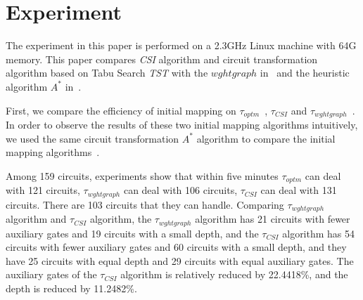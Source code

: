 \documentclass[runningheads]{llncs}
\begin{document}
\section{Experiment}
\label{Experiment}
The experiment in this paper is performed on a 2.3GHz Linux machine with 64G memory. This paper compares  \textit{CSI}  algorithm 
and circuit transformation algorithm based on Tabu Search \textit{TST} with the $wghtgraph$ in~\cite{2020Qubit} and the heuristic algorithm $ A^{*}$  in~\cite{Zulehner2017}.
 
First, we compare the efficiency of initial mapping on $\tau_{optm}$~\cite{Zulehner2017},  $\tau_{CSI}$ and $\tau_{wghtgraph}$~\cite{2020Qubit}. In order to observe the results of these two initial mapping algorithms intuitively, we used the same circuit transformation $ A^{*}$ algorithm to compare the initial mapping algorithms~\cite{Zulehner2017}.

Among 159 circuits, experiments show that within five minutes $\tau_{optm}$ can deal with 121 circuits, $\tau_{wghtgraph}$  can deal with 106 circuits, $\tau_{CSI}$  can deal with  131 circuits. There are 103 circuits that they can handle. Comparing $\tau_{wghtgraph}$ algorithm and $\tau_{CSI}$ algorithm, the $\tau_{wghtgraph}$ algorithm has 21 circuits with fewer auxiliary gates  and 19 circuits with a small depth, and the $\tau_{CSI}$ algorithm has 54 circuits with fewer auxiliary gates and 60 circuits with a small depth, and they have 25 circuits with equal depth and  29 circuits with equal auxiliary gates. The auxiliary gates of the $\tau_{CSI}$ algorithm is relatively reduced by 22.4418\%, 
and the depth is reduced by 11.2482\%.
\end{document}

